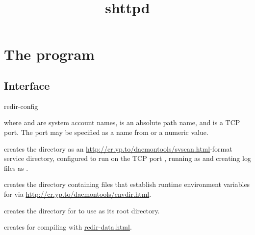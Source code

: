 \documentclass{book}
\title{shttpd}
\begin{document}
\section{The  program}

\subsection{Interface}
\begin{code}
  redir-config    
\end{code}
where  and  are system account names,
 is an absolute path name, and  is a TCP port.
The port may be specified as a name from  or a
numeric value.

 creates the directory  as an
\href{svscan}{http://cr.yp.to/daemontools/svscan.html}-format service
directory, configured to run  on the TCP port
, running  as  and creating log
files as .

 creates the directory 
containing files that establish runtime environment variables for
 via \href{envdir}{http://cr.yp.to/daemontools/envdir.html}.

 creates the directory  for
 to use as its root directory.

 creates  for compiling
 with \href{\cmd{redir-data}}{redir-data.html}.
\end{document}
